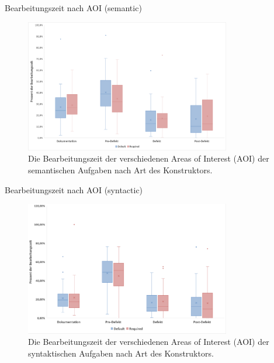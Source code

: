\documentclass[10pt]{beamer}
\begin{document}
	\begin{frame}{Bearbeitungszeit nach AOI (semantic)}
		\begin{figure}
			\includegraphics[width=0.8\textwidth]{graphics/box_time-aoi_sem.png}
			\caption{
				\label{fig:box_time-aoi_sem.png} 
				Die Bearbeitungszeit der verschiedenen Areas of Interest (AOI) der semantischen Aufgaben nach Art des Konstruktors.
			}
		\end{figure}
	\end{frame}

	\begin{frame}{Bearbeitungszeit nach AOI (syntactic)}
		\begin{figure}
			\includegraphics[width=0.8\textwidth]{graphics/box_time-aoi_syn.png}
			\caption{
				\label{fig:box_time-aoi_syn.png} 
				Die Bearbeitungszeit der verschiedenen Areas of Interest (AOI) der syntaktischen Aufgaben nach Art des Konstruktors.
			}
		\end{figure}
	\end{frame}
\end{document}

